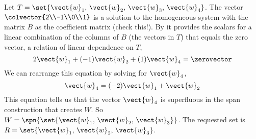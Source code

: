Let $T=\set{\vect{w}_1,\,\vect{w}_2,\,\vect{w}_3,\,\vect{w}_4}$.  The vector $\colvector{2\\-1\\0\\1}$
 is a solution to the homogeneous system with the matrix $B$ as the coefficient matrix (check this!).  By  it provides the scalars for a linear combination of the columns of $B$ (the vectors in $T$) that equals the zero vector, a relation of linear dependence on $T$,
%
\begin{equation*}
2\vect{w}_1+(-1)\vect{w}_2+(1)\vect{w}_4=\zerovector
\end{equation*}
%
We can rearrange this equation by solving for $\vect{w}_4$,
%
\begin{equation*}
\vect{w}_4=(-2)\vect{w}_1+\vect{w}_2
\end{equation*}
%
This equation tells us that the vector $\vect{w}_4$ is superfluous in the span construction that creates $W$.  So $W=\spn{\set{\vect{w}_1,\,\vect{w}_2,\,\vect{w}_3}}$.  The requested set is $R=\set{\vect{w}_1,\,\vect{w}_2,\,\vect{w}_3}$.
